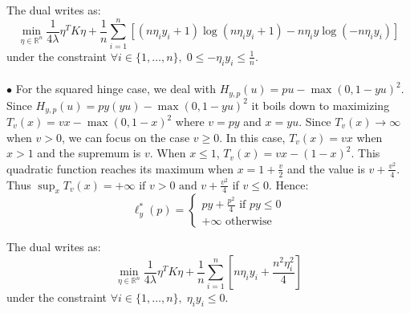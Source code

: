 \documentclass[a4paper,11pt, hidelinks]{article}
\begin{document}
\begin{enumerate}[a.]
The dual writes as:
$$
 \min_{\eta \in \mathbb{R}^n}\frac{1}{4 \lambda} \eta^T K \eta +  \frac{1}{n} \sum_{i=1}^n \left[(n\eta_iy_i+1)\log(n \eta_i y_i+1) - n\eta_iy\log(-n\eta_iy_i)\right]
$$
under the constraint $\forall i \in \{1,\ldots,n\},\; 0 \leq -\eta_i y_i \leq \frac{1}{n}$.
\\
\\
$\bullet$
For the squared hinge case, we deal with $ H_{y,p}(u) = pu - \max(0, 1-yu)^2 $. Since $ H_{y,p}(u) = py(yu) - \max(0, 1-yu)^2 $ it boils down to maximizing $ T_{v}(x) = vx - \max(0, 1-x)^2 $ where $v = py$ and $x = yu$. Since $ T_v(x) \to \infty $ when $ v > 0 $, we can focus on the case $ v \geq 0 $. In this case, $ T_v(x) = vx $ when $ x>1 $ and the supremum is $ v $. When $ x \leq 1 $, $ T_v(x) = vx - (1 - x)^2 $. This quadratic function reaches its maximum when $ x = 1 + \frac{v}{2} $ and the value is $ v + \frac{v^2}{4} $. Thus $ \sup_x T_v(x) = +\infty \text{ if } v>0 \text{ and } v + \frac{v^2}{4} $ if $ v \leq 0 $. Hence:
$$
 \ell_y^{*}(p)
=\left\{ 
\begin{array}{lr}
py + \frac{p^2}{4} \text{ if }  py \leq 0 \\ 
+\infty \text{ otherwise}
\end{array} 
\right.
$$

The dual writes as:
\begin{equation}
 \min_{\eta \in \mathbb{R}^n}\frac{1}{4 \lambda} \eta^T K \eta +  \frac{1}{n} \sum_{i=1}^n \left[n\eta_i y_i + \frac{n^2 \eta_i^2}{4}\right]
\end{equation}
under the constraint $\forall i \in \{1,\ldots,n\},\; \eta_i y_i \leq 0$.

\end{enumerate}


\newpage


\end{document}
